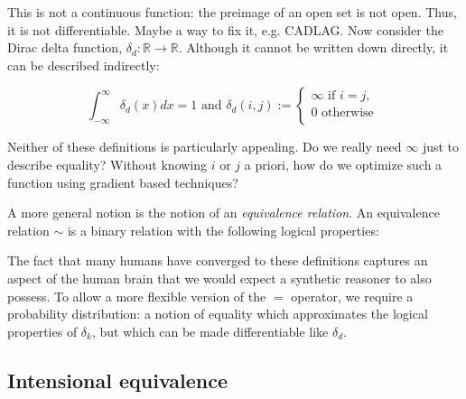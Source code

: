 \documentclass[11pt]{article}
\begin{document}
    This is not a continuous function: the preimage of an open set is not open. Thus, it is not differentiable. Maybe a way to fix it, e.g. CADLAG. Now consider the Dirac delta function, $\delta_d: \mathbb{R} \rightarrow \mathbb{R}$. Although it cannot be written down directly, it can be described indirectly:

    $$
    \int_{-\infty}^{\infty} \delta_d (x)dx = 1 \text{ and } \delta_d(i, j) :=
    \begin{cases}
        \infty \text{ if } i = j, \\
        0 \text{ otherwise }\\
    \end{cases}
    $$

    Neither of these definitions is particularly appealing. Do we really need $\infty$ just to describe equality? Without knowing $i$ or $j$ a priori, how do we optimize such a function using gradient based techniques?


    A more general notion is the notion of an \textit{equivalence relation}. An equivalence relation $\sim$ is a binary relation with the following logical properties:


    The fact that many humans have converged to these definitions captures an aspect of the human brain that we would expect a synthetic reasoner to also possess. To allow a more flexible version of the $=$ operator, we require a probability distribution: a notion of equality which approximates the logical properties of $\delta_k$, but which can be made differentiable like $\delta_d$.

    \subsection{Intensional equivalence}\label{subsec:intensional-equivalence}
\end{document}

